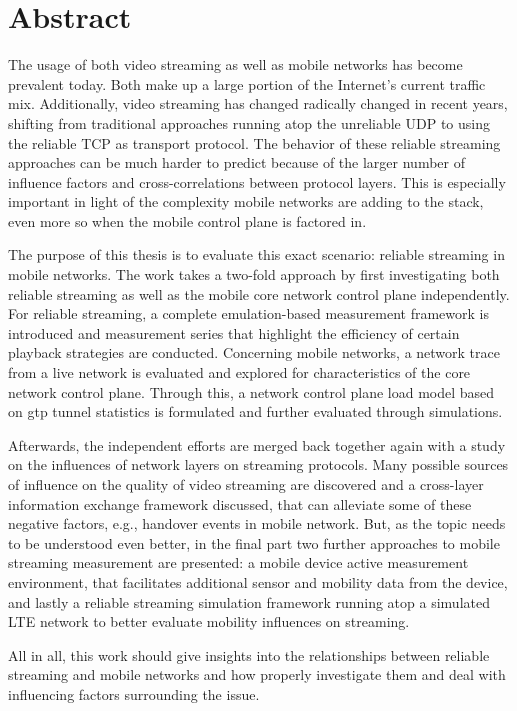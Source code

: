 \chapter*{Abstract}
%

The usage of both video streaming as well as mobile networks has become prevalent today. Both make up a large portion of the Internet's current traffic mix. Additionally, video streaming has changed radically changed in recent years, shifting from traditional approaches running atop the unreliable \acrshort{UDP} to using the reliable \acrshort{TCP} as transport protocol. The behavior of these reliable streaming approaches can be much harder to predict because of the larger number of influence factors and cross-correlations between protocol layers. This is especially important in light of the complexity mobile networks are adding to the stack, even more so when the mobile control plane is factored in.

The purpose of this thesis is to evaluate this exact scenario: reliable streaming in mobile networks. The work takes a two-fold approach by first investigating both reliable streaming as well as the mobile core network control plane independently. For reliable streaming, a complete emulation-based measurement framework is introduced and measurement series that highlight the efficiency of certain playback strategies are conducted. Concerning mobile networks, a network trace from a live network is evaluated and explored for characteristics of the core network control plane. Through this, a network control plane load model based on \acrshort{gtp} tunnel statistics is formulated and further evaluated through simulations.

Afterwards, the independent efforts are merged back together again with a study on the influences of network layers on streaming protocols. Many possible sources of influence on the quality of video streaming are discovered and a cross-layer information exchange framework discussed, that can alleviate some of these negative factors, e.g., handover events in mobile network. But, as the topic needs to be understood even better, in the final part two further approaches to mobile streaming measurement are presented: a mobile device active measurement environment, that facilitates additional sensor and mobility data from the device, and lastly a reliable streaming simulation framework running atop a simulated \acrshort{LTE} network to better evaluate mobility influences on streaming.

All in all, this work should give insights into the relationships between reliable streaming and mobile networks and how properly investigate them and deal with influencing factors surrounding the issue.